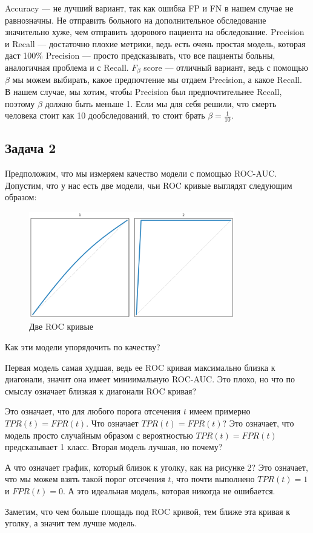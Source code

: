 \begin{solution}
Accuracy --- не лучший вариант, так как ошибка FP и FN в нашем случае не равнозначны.
Не отправить больного на дополнительное обследование значительно хуже, чем отправить здорового пациента на обследование.
Precision и Recall --- достаточно плохие метрики, ведь есть очень простая модель, которая даст 100\% Precision --- просто предсказывать, что все пациенты больны, аналогичная проблема и с Recall.
$F_{\beta}$ score --- отличный вариант, ведь с помощью $\beta$ мы можем выбирать, какое предпочтение мы отдаем Precision, а какое Recall.
В нашем случае, мы хотим, чтобы Precision был предпочтительнее Recall, поэтому $\beta$ должно быть меньше 1.
Если мы для себя решили, что смерть человека стоит как 10 дообследований, то стоит брать $\beta = \frac{1}{10}$.
\end{solution}
\subsection*{Задача 2}
Предположим, что мы измеряем качество модели с помощью ROC-AUC. Допустим, что у нас есть две модели, чьи ROC кривые выглядят следующим образом:
\begin{figure}[h]
    \centering
    \includegraphics[width=0.8\textwidth]{roc_curves_comparison_1.png}
    \caption{Две ROC кривые}
\end{figure}
Как эти модели упорядочить по качеству?

\begin{solution}
Первая модель самая худшая, ведь ее ROC кривая максимально близка к диагонали, значит она имеет миниимальную ROC-AUC.
Это плохо, но что по смыслу означает близкая к диагонали ROC кривая?

Это означает, что для любого порога отсечения $t$ имеем примерно $TPR(t) = FPR(t)$.
Что означает $TPR(t) = FPR(t)$? Это означает, что модель просто случайным образом с вероятностью $TPR(t)=FPR(t)$ предсказывает 1 класс.
Вторая модель лучшая, но почему?

А что означает график, который близок к уголку, как на рисунке 2?
Это означает, что мы можем взять такой порог отсечения $t$, что почти выполнено $TPR(t) = 1$ и $FPR(t) = 0$.
А это идеальная модель, которая никогда не ошибается.

Заметим, что чем больше площадь под ROC кривой, тем ближе эта кривая к уголку, а значит тем лучше модель.
\end{solution}
